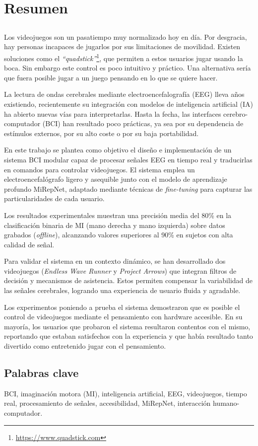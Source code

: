\chapter*{Resumen}

\section*{\tituloPortadaVal}

Los videojuegos son un pasatiempo muy normalizado hoy en día. Por desgracia,
hay personas incapaces de jugarlos por sus limitaciones de movilidad. Existen
soluciones como el
\textit{``quadstick''}\footnote{\url{https://www.quadstick.com}}, que permiten
a estos usuarios jugar usando la boca. Sin embargo este control es poco
intuitivo y práctico. Una alternativa sería que fuera posible jugar a un juego
pensando en lo que se quiere hacer.

La lectura de ondas cerebrales mediante electroencefalografía (EEG) lleva años
existiendo, recientemente su integración con modelos de inteligencia artificial
(IA) ha abierto nuevas vías para interpretarlas. Hasta la fecha, las interfaces
cerebro-computador (BCI) han resultado poco prácticas, ya sea por su
dependencia de estímulos externos, por su alto coste o por su baja
portabilidad.

En este trabajo se plantea como objetivo el diseño e implementación de un
sistema BCI modular capaz de procesar señales EEG en tiempo real y traducirlas
en comandos para controlar videojuegos. El sistema emplea un
electroencefalógrafo ligero y asequible junto con el modelo de aprendizaje
profundo MiRepNet, adaptado mediante técnicas de \textit{fine-tuning} para
capturar las particularidades de cada usuario.

Los resultados experimentales muestran una precisión media del 80\% en la
clasificación binaria de MI (mano derecha y mano izquierda) sobre datos
grabados (\textit{offline}), alcanzando valores superiores al 90\% en sujetos
con alta calidad de señal.

Para validar el sistema en un contexto dinámico, se han desarrollado dos
videojuegos (\textit{Endless Wave Runner} y \textit{Project Arrows}) que
integran filtros de decisión y mecanismos de asistencia. Estos permiten
compensar la variabilidad de las señales cerebrales, logrando una experiencia
de usuario fluida y agradable.

Los experimentos poniendo a prueba el sistema demostraron que es posible el
control de videojuegos mediante el pensamiento con hardware accesible. En su
mayoría, los usuarios que probaron el sistema resultaron contentos con el
mismo, reportando que estaban satisfechos con la experiencia y que había
resultado tanto divertido como entretenido jugar con el pensamiento.

\section*{Palabras clave}

\noindent BCI, imaginación motora (MI), inteligencia artificial, EEG, videojuegos, tiempo real, procesamiento de señales, accesibilidad, MiRepNet, interacción humano-computador.
